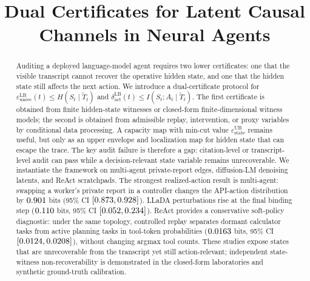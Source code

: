 \documentclass[conference,compsoc]{IEEEtran}
\title{Dual Certificates for Latent Causal Channels in Neural Agents}
\author{}
\begin{document}
  \maketitle

  \begin{abstract}
  Auditing a deployed language-model agent requires two lower certificates:
  one that the visible transcript cannot recover the operative hidden state,
  and one that the hidden state still affects the next action. We introduce a
  dual-certificate protocol for
  $\varepsilon_\mathrm{unrec}^\mathrm{LB}(t)\leq H(S_t\mid\tilde T_t)$ and
  $\delta_\mathrm{act}^\mathrm{LB}(t)\leq I(S_t;A_t\mid\tilde T_t)$. The first
  certificate is obtained from finite hidden-state witnesses or closed-form
  finite-dimensional witness models; the second is obtained from admissible
  replay, intervention, or proxy variables by conditional data processing. A
  capacity map with min-cut value $\varepsilon_\text{state}^\text{UB}$
  remains useful, but only as an upper envelope and localization map for hidden
  state that can escape the trace. The key audit
  failure is therefore a
  gap: citation-level or transcript-level audit can pass while a
  decision-relevant state variable remains unrecoverable. We instantiate the
  framework on multi-agent private-report edges, diffusion-LM denoising latents,
  and ReAct scratchpads. The strongest realized-action result is multi-agent:
  swapping a worker's private report in a controller changes the API-action
  distribution by $0.901$ bits (95\% CI
  $[0.873,0.928]$). LLaDA perturbations rise at the final binding
  step ($0.110$ bits, 95\% CI $[0.052,0.234]$). ReAct provides a
  conservative soft-policy diagnostic: under the same topology, controlled
  replay separates dormant calculator tasks from active planning tasks in
  tool-token probabilities ($0.0163$ bits, 95\% CI $[0.0124,0.0208]$),
  without changing argmax tool counts. These studies expose states that are
  unrecoverable from the transcript yet still action-relevant; independent
  state-witness non-recoverability is demonstrated in the closed-form
  laboratories and synthetic ground-truth calibration.
  \end{abstract}

  
  
  
  
  
  
  
  

  
  

  \newpage

  \appendices

  
  
  
  
  

  
\end{document}
